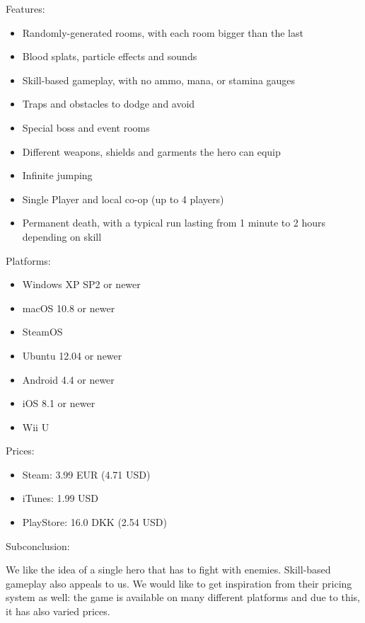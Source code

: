 \documentclass[12p]{article}
\begin{document}
\newpage

Features:

\begin{itemize}
  \item Randomly-generated rooms, with each room bigger than the last
  \item Blood splats, particle effects and sounds
  \item Skill-based gameplay, with no ammo, mana, or stamina gauges
  \item Traps and obstacles to dodge and avoid
  \item Special boss and event rooms
  \item Different weapons, shields and garments the hero can equip
  \item Infinite jumping
  \item Single Player and local co-op (up to 4 players)
  \item Permanent death, with a typical run lasting from 1 minute to 2 hours depending on skill
\end{itemize}

Platforms:

\begin{itemize}
    \item Windows XP SP2 or newer
    \item macOS 10.8 or newer
    \item SteamOS
    \item Ubuntu 12.04 or newer
    \item Android 4.4 or newer
    \item iOS 8.1 or newer
    \item Wii U
\end{itemize}

Prices:

\begin{itemize}
  \item Steam: 3.99 EUR (4.71 USD)
  \item iTunes: 1.99 USD
  \item PlayStore: 16.0 DKK (2.54 USD)
\end{itemize}

Subconclusion:

We like the idea of a single hero that has to fight with enemies. Skill-based gameplay also appeals to us. We would like to get inspiration from their pricing system as well: the game is available on many different platforms and due to this, it has also varied prices.
\end{document}
